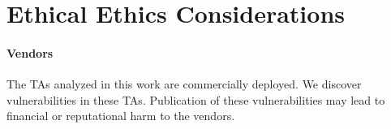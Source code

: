 \documentclass[conference]{IEEEtran} %
\newcommand{\sysname}{ScHMuzz\xspace}
\newcommand{\optee}{OP-TEE\xspace}
\newcommand{\numTAs}{66\xspace}
\newcommand{\numdfsmerge}{17,232\xspace}
\newcommand{\numvulns}{six\xspace}
\providecommand{\DIFaddtex}[1]{{\protect\color{blue} \sf #1}} %
\providecommand{\DIFdeltex}[1]{{\protect\color{red} \scriptsize #1}} %
\providecommand{\DIFaddbegin}{} %
\providecommand{\DIFaddend}{} %
\providecommand{\DIFdelbegin}{} %
\providecommand{\DIFdelend}{} %
\providecommand{\DIFadd}[1]{\texorpdfstring{\DIFaddtex{#1}}{#1}} %
\providecommand{\DIFdel}[1]{\texorpdfstring{\DIFdeltex{#1}}{}} %
\begin{document}
%

\DIFdelbegin %

\DIFdelend %
\section*{\DIFdelbegin \DIFdel{Ethical }\DIFdelend \DIFaddbegin \DIFadd{Ethics }\DIFaddend Considerations}\label{sec:trash}

\paragraph{Vendors} The TAs analyzed in this work are commercially
deployed. We discover vulnerabilities in these TAs. Publication of these
vulnerabilities may lead to financial or reputational harm to the vendors.
\end{document}
